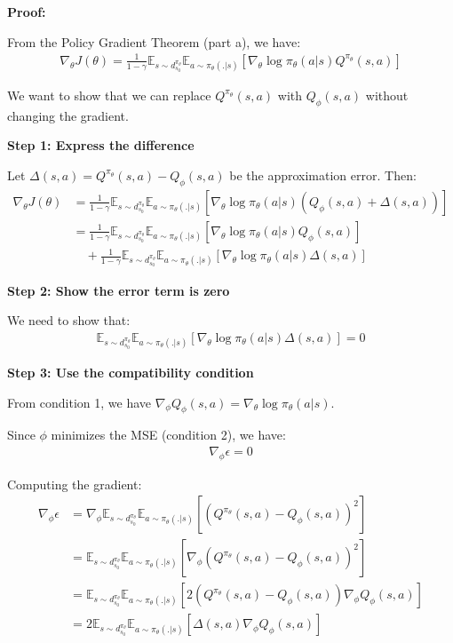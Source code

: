 \textbf{Proof:}

From the Policy Gradient Theorem (part a), we have:
\begin{align}
\nabla_\theta J(\theta) = \frac{1}{1-\gamma}\mathbb{E}_{s \sim d^{\pi_\theta}_{s_0}}\mathbb{E}_{a \sim \pi_\theta(.|s)} [\nabla_\theta \log \pi_\theta (a|s) Q^{\pi_\theta} (s, a)]
\end{align}

We want to show that we can replace $Q^{\pi_\theta}(s,a)$ with $Q_\phi(s,a)$ without changing the gradient.

\textbf{Step 1: Express the difference}

Let $\Delta(s,a) = Q^{\pi_\theta}(s,a) - Q_\phi(s,a)$ be the approximation error. Then:
\begin{align}
\nabla_\theta J(\theta) &= \frac{1}{1-\gamma}\mathbb{E}_{s \sim d^{\pi_\theta}_{s_0}}\mathbb{E}_{a \sim \pi_\theta(.|s)} [\nabla_\theta \log \pi_\theta (a|s) (Q_\phi(s,a) + \Delta(s,a))] \\
&= \frac{1}{1-\gamma}\mathbb{E}_{s \sim d^{\pi_\theta}_{s_0}}\mathbb{E}_{a \sim \pi_\theta(.|s)} [\nabla_\theta \log \pi_\theta (a|s) Q_\phi(s,a)] \\
&\quad + \frac{1}{1-\gamma}\mathbb{E}_{s \sim d^{\pi_\theta}_{s_0}}\mathbb{E}_{a \sim \pi_\theta(.|s)} [\nabla_\theta \log \pi_\theta (a|s) \Delta(s,a)]
\end{align}

\textbf{Step 2: Show the error term is zero}

We need to show that:
\begin{align}
\mathbb{E}_{s \sim d^{\pi_\theta}_{s_0}}\mathbb{E}_{a \sim \pi_\theta(.|s)} [\nabla_\theta \log \pi_\theta (a|s) \Delta(s,a)] = 0
\end{align}

\textbf{Step 3: Use the compatibility condition}

From condition 1, we have $\nabla_{\phi} Q_\phi(s, a) = \nabla_\theta \log \pi_\theta (a|s)$.

Since $\phi$ minimizes the MSE (condition 2), we have:
\begin{align}
\nabla_\phi \epsilon = 0
\end{align}

Computing the gradient:
\begin{align}
\nabla_\phi \epsilon &= \nabla_\phi \mathbb{E}_{s \sim d^{\pi_\theta}_{s_0}}\mathbb{E}_{a \sim \pi_\theta(.|s)} [(Q^{\pi_\theta} (s, a) - Q_\phi(s, a))^2] \\
&= \mathbb{E}_{s \sim d^{\pi_\theta}_{s_0}}\mathbb{E}_{a \sim \pi_\theta(.|s)} [\nabla_\phi (Q^{\pi_\theta} (s, a) - Q_\phi(s, a))^2] \\
&= \mathbb{E}_{s \sim d^{\pi_\theta}_{s_0}}\mathbb{E}_{a \sim \pi_\theta(.|s)} [2(Q^{\pi_\theta} (s, a) - Q_\phi(s, a)) \nabla_\phi Q_\phi(s, a)] \\
&= 2\mathbb{E}_{s \sim d^{\pi_\theta}_{s_0}}\mathbb{E}_{a \sim \pi_\theta(.|s)} [\Delta(s,a) \nabla_\phi Q_\phi(s, a)]
\end{align}

